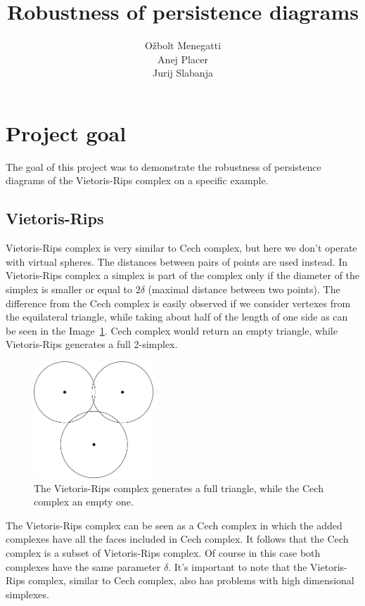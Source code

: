 \documentclass[11pt]{article}
\title{\textbf{Robustness of persistence diagrams}}
\author{O\v zbolt Menegatti\\
		Anej Placer\\
		Jurij Slabanja}
\date{}
\begin{document}
\maketitle

\section{Project goal}

The goal of this project was to demonstrate the robustness of persistence diagrams of the Vietoris-Rips complex on a specific example.

\subsection{Vietoris-Rips}
Vietoris-Rips complex is very similar to Cech complex, but here we don't operate with virtual spheres. The distances between pairs of points are used instead. In Vietoris-Rips complex a simplex is part of the complex only if the diameter of the simplex is smaller or equal to $2\delta$ (maximal distance between two points). The difference from the Cech complex is easily observed if we consider vertexes from the equilateral triangle, while taking about half of the length of one side as can be seen in the Image~\ref{fig:vrdiag}. Cech complex would return an empty triangle, while Vietoris-Rips generates a full 2-simplex.\cite{Zomorodian2010263}

\begin{figure}[!htb]
    \centering
    \includegraphics[width=0.4\textwidth]{vrdiag.png}
    \caption{The Vietoris-Rips complex generates a full triangle, while the Cech complex an empty one.}
    \label{fig:vrdiag}
\end{figure}

The Vietoris-Rips complex can be seen as a Cech complex in which the added complexes have all the faces included in Cech complex. It follows that the Cech complex is a subset of Vietoris-Rips complex. Of course in this case both complexes have the same parameter $\delta$. It's important to note that the Vietoris-Rips complex, similar to Cech complex, also has problems with high dimensional simplexes.
\end{document}
